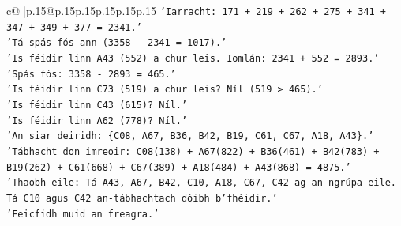 \documentclass{article}
\begin{document}
{\begin{supertabular}{c@{$\;$}|p{.15\linewidth}@{}p{.15\linewidth}p{.15\linewidth}p{.15\linewidth}p{.15\linewidth}p{.15\linewidth}}
{{{\texttt{'Iarracht: 171 + 219 + 262 + 275 + 341 + 347 + 349 + 377 = 2341.'} \\
\texttt{'Tá spás fós ann (3358 {-} 2341 = 1017).'} \\
\texttt{'Is féidir linn A43 (552) a chur leis. Iomlán: 2341 + 552 = 2893.'} \\
\texttt{'Spás fós: 3358 {-} 2893 = 465.'} \\
\texttt{'Is féidir linn C73 (519) a chur leis? Níl (519 > 465).'} \\
\texttt{'Is féidir linn C43 (615)? Níl.'} \\
\texttt{'Is féidir linn A62 (778)? Níl.'} \\
\texttt{'An siar deiridh: \{C08, A67, B36, B42, B19, C61, C67, A18, A43\}.'} \\
\texttt{'Tábhacht don imreoir: C08(138) + A67(822) + B36(461) + B42(783) + B19(262) + C61(668) + C67(389) + A18(484) + A43(868) = 4875.'} \\
\texttt{'Thaobh eile: Tá A43, A67, B42, C10, A18, C67, C42 ag an ngrúpa eile. Tá C10 agus C42 an{-}tábhachtach dóibh b'fhéidir.'} \\
\texttt{'Feicfidh muid an freagra.'} \\
            }
        }
    }
     \\ \\


\end{supertabular}}
\end{document}
